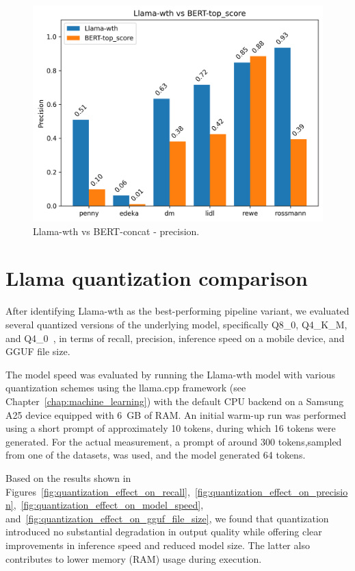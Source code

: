 \documentclass[licencjacka,en]{pracamgr}
\begin{document}
\begin{figure}[htbp]
    \centering
    \includegraphics[width=0.8\linewidth]{bachelor_images/benchmark/llama_vs_bert_precision.png}
    \caption{Llama-wth vs BERT-concat - precision.}
    \label{fig:llama_vs_bert_precision}
\end{figure}

\FloatBarrier

\section{Llama quantization comparison}

After identifying Llama-wth as the best-performing pipeline variant, we evaluated several quantized versions of the underlying model, specifically Q8\_0, Q4\_K\_M, and Q4\_0~\cite{llama-cpp-quantization}, in terms of recall, precision, inference speed on a mobile device, and GGUF file size.

The model speed was evaluated by running the Llama-wth model with various quantization schemes using the llama.cpp framework (see Chapter~\ref{chap:machine_learning}) with the default CPU backend on a Samsung A25 device equipped with 6~GB of RAM. An initial warm-up run was performed using a short prompt of approximately 10 tokens, during which 16 tokens were generated. For the actual measurement, a prompt of around 300 tokens,sampled from one of the datasets, was used, and the model generated 64 tokens.

Based on the results shown in Figures~\ref{fig:quantization_effect_on_recall},~\ref{fig:quantization_effect_on_precision},~\ref{fig:quantization_effect_on_model_speed}, and~\ref{fig:quantization_effect_on_gguf_file_size}, we found that quantization introduced no substantial degradation in output quality while offering clear improvements in inference speed and reduced model size. The latter also contributes to lower memory (RAM) usage during execution.
\end{document}

